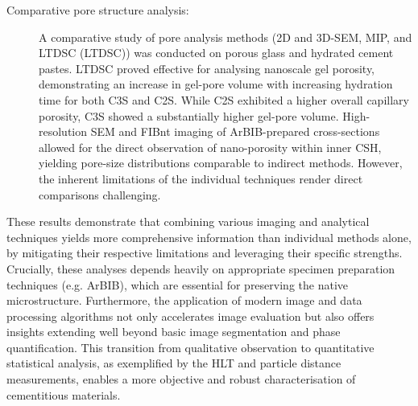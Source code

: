 \begin{description}
    \item[Comparative pore structure analysis:]
    A comparative study of pore analysis methods (2D and 3D-\ac{SEM}, \acl{MIP}, and \acl{LTDSC} (\acs{LTDSC})) was conducted on porous glass and hydrated cement pastes.
    \ac{LTDSC} proved effective for analysing nanoscale gel porosity, demonstrating an increase in gel-pore volume with increasing hydration time for both \ac{C3S} and \ac{C2S}.
    While \ac{C2S} exhibited a higher overall capillary porosity, \ac{C3S} showed a substantially higher gel-pore volume.
    High-resolution \ac{SEM} and \ac{FIBnt} imaging of \ac{ArBIB}-prepared cross-sections allowed for the direct observation of nano-porosity within inner \ac{CSH}, yielding pore-size distributions comparable to indirect methods.
    However, the inherent limitations of the individual techniques render direct comparisons challenging.

\end{description}

These results demonstrate that combining various imaging and analytical techniques yields more comprehensive information than individual methods alone, by mitigating their respective limitations and leveraging their specific strengths.
Crucially, these analyses depends heavily on appropriate specimen preparation techniques (e.g. \ac{ArBIB}), which are essential for preserving the native microstructure.
Furthermore, the application of modern image and data processing algorithms not only accelerates image evaluation but also offers insights extending well beyond basic image segmentation and phase quantification.
This transition from qualitative observation to quantitative statistical analysis, as exemplified by the \ac{HLT} and particle distance measurements, enables a more objective and robust characterisation of cementitious materials.

